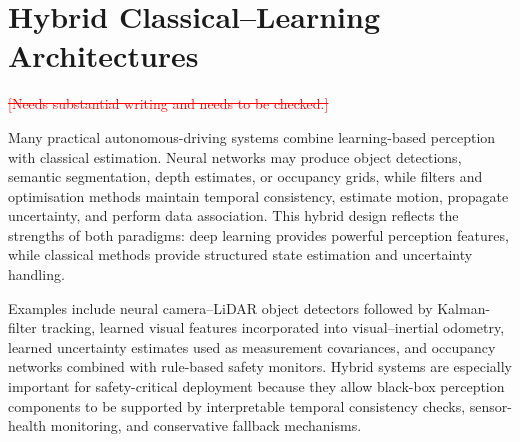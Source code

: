 \documentclass[11pt,oneside,openany]{book}
\newcommand{\deleted}[1]{\textcolor{red}{\sout{#1}}}
\begin{document}
\section{Hybrid Classical--Learning Architectures}
\deleted{[Needs substantial writing and needs to be checked.]} %

Many practical autonomous-driving systems combine learning-based perception with classical estimation. Neural networks may produce object detections, semantic segmentation, depth estimates, or occupancy grids, while filters and optimisation methods maintain temporal consistency, estimate motion, propagate uncertainty, and perform data association. This hybrid design reflects the strengths of both paradigms: deep learning provides powerful perception features, while classical methods provide structured state estimation and uncertainty handling.

Examples include neural camera--LiDAR object detectors followed by Kalman-filter tracking, learned visual features incorporated into visual--inertial odometry, learned uncertainty estimates used as measurement covariances, and occupancy networks combined with rule-based safety monitors. Hybrid systems are especially important for safety-critical deployment because they allow black-box perception components to be supported by interpretable temporal consistency checks, sensor-health monitoring, and conservative fallback mechanisms.
\end{document}
